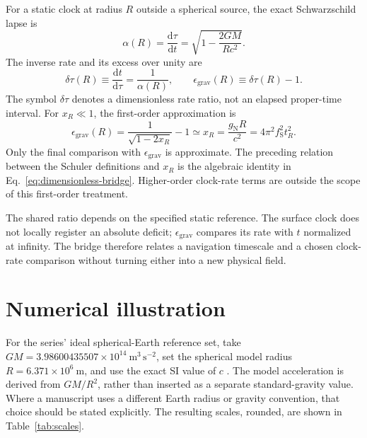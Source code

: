 \documentclass[12pt]{article}
\begin{document}
For a static clock at radius $R$ outside a spherical source, the exact Schwarzschild lapse is
\begin{equation}
  \alpha(R)=\frac{\mathrm{d}\tau}{\mathrm{d}t}
  =\sqrt{1-\frac{2GM}{Rc^2}}.
  \label{eq:schwarzschild-lapse}
\end{equation}
The inverse rate and its excess over unity are
\begin{equation}
  \delta\tau(R)\equiv\frac{\mathrm{d}t}{\mathrm{d}\tau}
  =\frac{1}{\alpha(R)},
  \qquad
  \epsilon_{\mathrm{grav}}(R)\equiv\delta\tau(R)-1.
  \label{eq:inverse-rate}
\end{equation}
The symbol $\delta\tau$ denotes a dimensionless rate ratio, not an elapsed proper-time interval. For $x_R\ll1$, the first-order approximation is
\begin{equation}
  \epsilon_{\mathrm{grav}}(R)
  =\frac{1}{\sqrt{1-2x_R}}-1
  \simeq x_R
  =\frac{g_{\mathrm{N}}R}{c^2}
  =4\pi^2 f_{\mathrm{S}}^2t_R^2.
  \label{eq:first-order-clock-bridge}
\end{equation}
Only the final comparison with $\epsilon_{\mathrm{grav}}$ is approximate. The preceding relation between the Schuler definitions and $x_R$ is the algebraic identity in Eq.~\eqref{eq:dimensionless-bridge}. Higher-order clock-rate terms are outside the scope of this first-order treatment.

The shared ratio depends on the specified static reference. The surface clock does not locally register an absolute deficit; $\epsilon_{\mathrm{grav}}$ compares its rate with $t$ normalized at infinity. The bridge therefore relates a navigation timescale and a chosen clock-rate comparison without turning either into a new physical field.

\section{Numerical illustration}

For the series' ideal spherical-Earth reference set, take $GM=3.98600435507\times10^{14}\ \mathrm{m^3\,s^{-2}}$, set the spherical model radius $R=6.371\times10^6\ \mathrm{m}$, and use the exact SI value of $c$ \cite{JPL,Moritz,BIPM}. The model acceleration is derived from $GM/R^2$, rather than inserted as a separate standard-gravity value. Where a manuscript uses a different Earth radius or gravity convention, that choice should be stated explicitly. The resulting scales, rounded, are shown in Table~\ref{tab:scales}.
\end{document}
